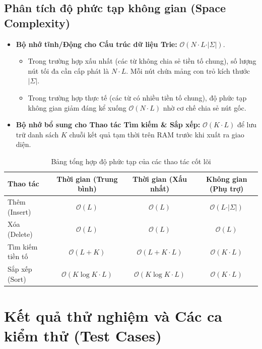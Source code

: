\documentclass[12pt,a4paper]{report}
\begin{document}
\subsection{Phân tích độ phức tạp không gian (Space Complexity)}

\begin{itemize}
    \item \textbf{Bộ nhớ tĩnh/Động cho Cấu trúc dữ liệu Trie:} $\mathcal{O}(N \cdot L \cdot \vert{}\Sigma\vert{})$.
    \begin{itemize}
        \item Trong trường hợp xấu nhất (các từ không chia sẻ tiền tố chung), số lượng nút tối đa cần cấp phát là $N \cdot L$. Mỗi nút chứa mảng con trỏ kích thước $\vert{}\Sigma\vert{}$.
        \item Trong trường hợp thực tế (các từ có nhiều tiền tố chung), độ phức tạp không gian giảm đáng kể xuống $\mathcal{O}(N \cdot L)$ nhờ cơ chế chia sẻ nút gốc.
    \end{itemize}
    \item \textbf{Bộ nhớ bổ sung cho Thao tác Tìm kiếm \& Sắp xếp:} $\mathcal{O}(K \cdot L)$ để lưu trữ danh sách $K$ chuỗi kết quả tạm thời trên RAM trước khi xuất ra giao diện.
\end{itemize}

\begin{table}[htbp]
\centering
\caption{Bảng tổng hợp độ phức tạp của các thao tác cốt lõi}
\label{tab:do_phuc_tap}
\begin{tabular}{|l|c|c|c|}
\hline
\textbf{Thao tác} & \textbf{Thời gian (Trung bình)} & \textbf{Thời gian (Xấu nhất)} & \textbf{Không gian (Phụ trợ)} \\ \hline
Thêm (Insert) & $\mathcal{O}(L)$ & $\mathcal{O}(L)$ & $\mathcal{O}(L \cdot \vert{}\Sigma\vert{})$ \\ \hline
Xóa (Delete) & $\mathcal{O}(L)$ & $\mathcal{O}(L)$ & $\mathcal{O}(L)$ \\ \hline
Tìm kiếm tiền tố & $\mathcal{O}(L + K)$ & $\mathcal{O}(L + K \cdot L)$ & $\mathcal{O}(K \cdot L)$ \\ \hline
Sắp xếp (Sort) & $\mathcal{O}(K \log K \cdot L)$ & $\mathcal{O}(K \log K \cdot L)$ & $\mathcal{O}(K \cdot L)$ \\ \hline
\end{tabular}
\end{table}

\section{Kết quả thử nghiệm và Các ca kiểm thử (Test Cases)}
\label{sec:ket_qua_thu_nghiem}
\end{document}
